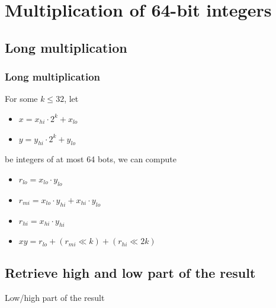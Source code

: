 \documentclass[10pt]{beamer}
\begin{document}
\section{Multiplication of 64-bit integers}
\subsection{Long multiplication}
\begin{frame}
    \frametitle{Long multiplication}
    \begin{example}
        For some $k \leq 32$, let
        \begin{itemize}
            \item $x = x_{hi} \cdot 2^k + x_{lo}$
            \item $y = y_{hi} \cdot 2^k + y_{lo}$
        \end{itemize}
        be integers of at most 64 bots, we can compute
        \begin{itemize}
            \item $r_{lo} = x_{lo} \cdot y_{lo}$
            \item $r_{mi} = x_{lo} \cdot y_{hi} + x_{hi} \cdot y_{lo}$
            \item $r_{hi} = x_{hi} \cdot y_{hi}$
        \end{itemize}
    \end{example}
    \begin{itemize}
        \item $xy = r_{lo} + (r_{mi} \ll k) + (r_{hi} \ll 2k)$
    \end{itemize}
\end{frame}

\subsection{Retrieve high and low part of the result}
\begin{frame}
    Low/high part of the result
\end{frame}
\end{document}
